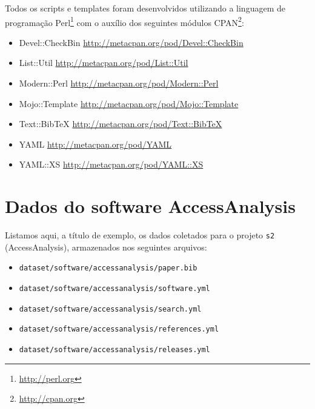 
Todos os scripts e templates foram desenvolvidos utilizando a linguagem de
programação Perl\footnote{\url{http://perl.org}} com o auxílio dos seguintes
módulos CPAN\footnote{\url{http://cpan.org}}:

\begin{itemize}
  \item Devel::CheckBin \url{http://metacpan.org/pod/Devel::CheckBin}
  \item List::Util \url{http://metacpan.org/pod/List::Util}
  \item Modern::Perl \url{http://metacpan.org/pod/Modern::Perl}
  \item Mojo::Template \url{http://metacpan.org/pod/Mojo::Template}
  \item Text::BibTeX \url{http://metacpan.org/pod/Text::BibTeX}
  \item YAML \url{http://metacpan.org/pod/YAML}
  \item YAML::XS \url{http://metacpan.org/pod/YAML::XS}
\end{itemize}




\section{Dados do software AccessAnalysis}

Listamos aqui, a título de exemplo, os dados coletados para o projeto
\texttt{s2} (AccessAnalysis), armazenados nos seguintes arquivos:

\begin{itemize}
  \item \texttt{dataset/software/accessanalysis/paper.bib}
  \item \texttt{dataset/software/accessanalysis/software.yml}
  \item \texttt{dataset/software/accessanalysis/search.yml}
  \item \texttt{dataset/software/accessanalysis/references.yml}
  \item \texttt{dataset/software/accessanalysis/releases.yml}
\end{itemize}

